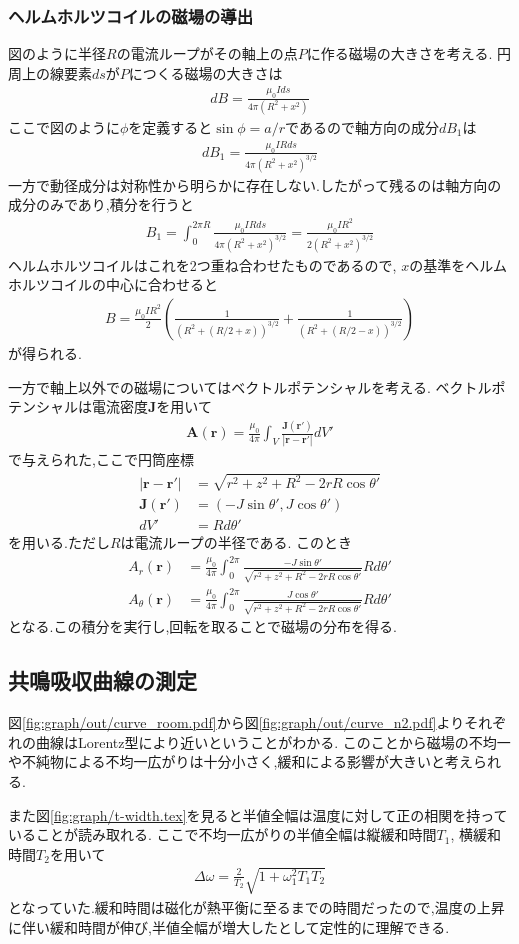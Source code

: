 \subsubsection{ヘルムホルツコイルの磁場の導出}
図のように半径$R$の電流ループがその軸上の点$P$に作る磁場の大きさを考える.
円周上の線要素$ds$が$P$につくる磁場の大きさは
\begin{align}
  dB=\frac{\mu_0Ids}{4\pi(R^2+x^2)}
\end{align}
ここで図のように$\phi$を定義すると$\sin\phi=a/r$であるので軸方向の成分$dB_1$は
\begin{align}
  dB_1=\frac{\mu_0IRds}{4\pi(R^2+x^2)^{3/2}}
\end{align}
一方で動径成分は対称性から明らかに存在しない.したがって残るのは軸方向の成分のみであり,積分を行うと
\begin{align}
  B_1=\int_0^{2\pi R}\frac{\mu_0IRds}{4\pi(R^2+x^2)^{3/2}}=\frac{\mu_0IR^2}{2(R^2+x^2)^{3/2}}
\end{align}
ヘルムホルツコイルはこれを2つ重ね合わせたものであるので,
$x$の基準をヘルムホルツコイルの中心に合わせると
\begin{align}
  B=\frac{\mu_0IR^2}{2}\left(\frac{1}{(R^2+(R/2+x))^{3/2}}+\frac{1}{(R^2+(R/2-x))^{3/2}}\right)
\end{align}
が得られる.

一方で軸上以外での磁場についてはベクトルポテンシャルを考える.
ベクトルポテンシャルは電流密度$\bm J$を用いて
\begin{align}
  {\bm A}({\bm r})=\frac{\mu_0}{4\pi}\int_V\frac{{\bm J({\bm r}')}}{|{\bm r}-{\bm r}'|}dV'
\end{align}
で与えられた,ここで円筒座標
\begin{align}
  |{\bm r}-{\bm r}'|&=\sqrt{r^2+z^2+R^2-2rR\cos\theta'}\\
  {\bm J}({\bm r}')&=(-J\sin\theta',J\cos\theta')\\
  dV'&=Rd\theta'
\end{align}
を用いる.ただし$R$は電流ループの半径である.
このとき
\begin{align}
  A_r({\bm r})&=\frac{\mu_0}{4\pi}\int_0^{2\pi}\frac{-J\sin\theta'}{\sqrt{r^2+z^2+R^2-2rR\cos\theta'}}Rd\theta'\\
  A_\theta({\bm r})&=\frac{\mu_0}{4\pi}\int_0^{2\pi}\frac{J\cos\theta'}{\sqrt{r^2+z^2+R^2-2rR\cos\theta'}}Rd\theta'
\end{align}
となる.この積分を実行し,回転を取ることで磁場の分布を得る.
\subsection{共鳴吸収曲線の測定}
図\ref{fig:graph/out/curve_room.pdf}から図\ref{fig:graph/out/curve_n2.pdf}よりそれぞれの曲線はLorentz型により近いということがわかる.
このことから磁場の不均一や不純物による不均一広がりは十分小さく,緩和による影響が大きいと考えられる.

また図\ref{fig:graph/t-width.tex}を見ると半値全幅は温度に対して正の相関を持っていることが読み取れる.
ここで不均一広がりの半値全幅は縦緩和時間$T_1$, 横緩和時間$T_2$を用いて
\begin{align}
  \Delta\omega=\frac{2}{T_2}\sqrt{1+\omega_1^2T_1T_2}
\end{align}
となっていた.緩和時間は磁化が熱平衡に至るまでの時間だったので,温度の上昇に伴い緩和時間が伸び,半値全幅が増大したとして定性的に理解できる.